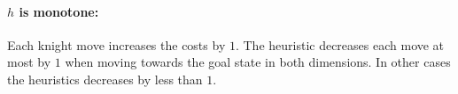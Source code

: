 \documentclass[11pt]{article}
\begin{document}
\paragraph{$h$ is monotone:}
Each knight move increases the costs by $1$. The heuristic decreases each move at most by $1$ when moving towards the goal state in both dimensions. In other cases the heuristics decreases by less than $1$.  

\subsection{}
\end{document}
